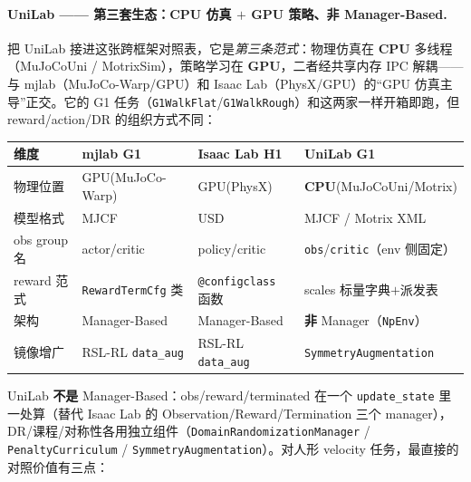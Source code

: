 \paragraph{UniLab —— 第三套生态：CPU 仿真 $+$ GPU 策略、非 Manager-Based.}
把 UniLab 接进这张跨框架对照表，它是\emph{第三条范式}：物理仿真在 \textbf{CPU} 多线程（MuJoCoUni / MotrixSim），策略学习在 \textbf{GPU}，二者经共享内存 IPC 解耦——与 mjlab（MuJoCo-Warp/GPU）和 Isaac Lab（PhysX/GPU）的“GPU 仿真主导”正交。它的 G1 任务（\texttt{G1WalkFlat}/\texttt{G1WalkRough}）和这两家一样开箱即跑，但 reward/action/DR 的组织方式不同：

\begin{center}
\small
\begin{tabular}{llll}
\hline
维度 & mjlab G1 & Isaac Lab H1 & UniLab G1 \\
\hline
物理位置 & GPU(MuJoCo-Warp) & GPU(PhysX) & \textbf{CPU}(MuJoCoUni/Motrix) \\
模型格式 & MJCF & USD & MJCF / Motrix XML \\
obs group 名 & actor/critic & policy/critic & \texttt{obs}/\texttt{critic}（env 侧固定） \\
reward 范式 & \texttt{RewardTermCfg} 类 & \texttt{@configclass} 函数 & scales 标量字典$+$派发表 \\
架构 & Manager-Based & Manager-Based & \textbf{非} Manager（\texttt{NpEnv}） \\
镜像增广 & RSL-RL \texttt{data\_aug} & RSL-RL \texttt{data\_aug} & \texttt{SymmetryAugmentation} \\
\hline
\end{tabular}
\end{center}

UniLab \textbf{不是} Manager-Based：obs/reward/terminated 在一个 \texttt{update\_state} 里一处算（替代 Isaac Lab 的 Observation/Reward/Termination 三个 manager），DR/课程/对称性各用独立组件（\texttt{DomainRandomizationManager} / \texttt{PenaltyCurriculum} / \texttt{SymmetryAugmentation}）。对人形 velocity 任务，最直接的对照价值有三点：

